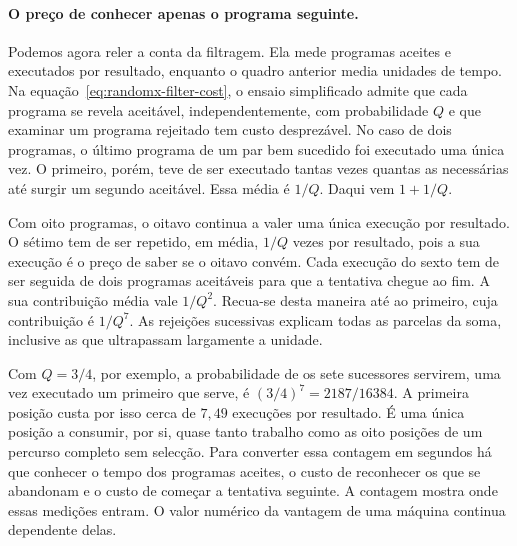 \paragraph{O preço de conhecer apenas o programa seguinte.}
Podemos agora reler a conta da filtragem. Ela mede programas aceites e
executados por resultado, enquanto o quadro anterior media unidades de
tempo. Na equação~\eqref{eq:randomx-filter-cost}, o ensaio simplificado
admite que cada programa se revela aceitável, independentemente, com
probabilidade \(Q\) e que examinar um programa rejeitado tem custo
desprezável. No caso de dois programas, o último programa de um par bem
sucedido foi executado uma única vez. O primeiro, porém, teve de ser
executado tantas vezes quantas as necessárias até surgir um segundo
aceitável. Essa média é \(1/Q\). Daqui vem \(1+1/Q\).

Com oito programas, o oitavo continua a valer uma única execução por
resultado. O sétimo tem de ser repetido, em média, \(1/Q\) vezes por
resultado, pois a sua execução é o preço de saber se o oitavo convém.
Cada execução do sexto tem de ser seguida de dois programas aceitáveis
para que a tentativa chegue ao fim. A sua contribuição média vale
\(1/Q^2\). Recua-se desta maneira até ao primeiro, cuja contribuição é
\(1/Q^7\). As rejeições sucessivas explicam todas as parcelas da soma,
inclusive as que ultrapassam largamente a unidade.

Com \(Q=3/4\), por exemplo, a probabilidade de os sete sucessores
servirem, uma vez executado um primeiro que serve, é
\((3/4)^7=2187/16384\). A primeira posição custa por isso cerca de
\(7{,}49\) execuções por resultado. É uma única posição a consumir,
por si, quase tanto trabalho como as oito posições de um percurso
completo sem selecção. Para converter essa contagem em segundos há que
conhecer o tempo dos programas aceites, o custo de reconhecer os que
se abandonam e o custo de começar a tentativa seguinte. A contagem
mostra onde essas medições entram. O valor numérico da vantagem de uma
máquina continua dependente delas.
